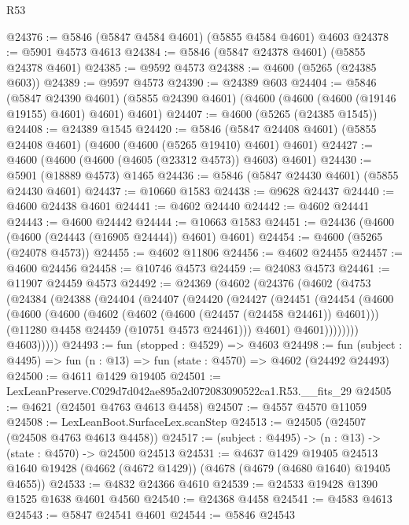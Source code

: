 \begin{lexlean}{R53}
\begin{coremodule}
@24376 := @5846 (@5847 @4584 @4601) (@5855 @4584 @4601) @4603
@24378 := @5901 @4573 @4613
@24384 := @5846 (@5847 @24378 @4601) (@5855 @24378 @4601)
@24385 := @9592 @4573
@24388 := @4600 (@5265 (@24385 @603))
@24389 := @9597 @4573
@24390 := @24389 @603
@24404 := @5846
    (@5847 @24390 @4601)
    (@5855 @24390 @4601)
    (@4600 (@4600 (@4600 (@19146 @19155) @4601) @4601) @4601)
@24407 := @4600 (@5265 (@24385 @1545))
@24408 := @24389 @1545
@24420 := @5846 (@5847 @24408 @4601) (@5855 @24408 @4601) (@4600 (@4600 (@5265 @19410) @4601) @4601)
@24427 := @4600 (@4600 (@4600 (@4605 (@23312 @4573)) @4603) @4601)
@24430 := @5901 (@18889 @4573) @1465
@24436 := @5846 (@5847 @24430 @4601) (@5855 @24430 @4601)
@24437 := @10660 @1583
@24438 := @9628 @24437
@24440 := @4600 @24438 @4601
@24441 := @4602 @24440
@24442 := @4602 @24441
@24443 := @4600 @24442
@24444 := @10663 @1583
@24451 := @24436 (@4600 (@4600 (@24443 (@16905 @24444)) @4601) @4601)
@24454 := @4600 (@5265 (@24078 @4573))
@24455 := @4602 @11806
@24456 := @4602 @24455
@24457 := @4600 @24456
@24458 := @10746 @4573
@24459 := @24083 @4573
@24461 := @11907 @24459 @4573
@24492 := @24369
    (@4602
      (@24376
        (@4602
          (@4753
            (@24384
              (@24388
                (@24404
                  (@24407
                    (@24420
                      (@24427
                        (@24451
                          (@24454
                            (@4600
                              (@4600
                                (@4600
                                  (@4602 (@4602 (@4600 (@24457 (@24458 @24461)) @4601)))
                                  (@11280 @4458 @24459 (@10751 @4573 @24461)))
                                @4601)
                              @4601))))))))
              @4603)))))
@24493 := fun (stopped : @4529) => @4603
@24498 := fun (subject : @4495) => fun (n : @13) => fun (state : @4570) => @4602 (@24492 @24493)
@24500 := @4611 @1429 @19405
@24501 := LexLeanPreserve.C029d7d042ae895a2d072083090522ca1.R53.__fits_29
@24505 := @4621 (@24501 @4763 @4613 @4458)
@24507 := @4557 @4570 @11059
@24508 := LexLeanBoot.SurfaceLex.scanStep
@24513 := @24505 (@24507 (@24508 @4763 @4613 @4458))
@24517 := (subject : @4495) -> (n : @13) -> (state : @4570) -> @24500 @24513
@24531 := @4637
    @1429
    @19405
    @24513
    @1640
    @19428
    (@4662 (@4672 @1429))
    (@4678 (@4679 (@4680 @1640) @19405 @4655))
@24533 := @4832 @24366 @4610
@24539 := @24533 @19428 @1390 @1525 @1638 @4601 @4560
@24540 := @24368 @4458
@24541 := @4583 @4613
@24543 := @5847 @24541 @4601
@24544 := @5846 @24543

\end{coremodule}
\end{lexlean}
